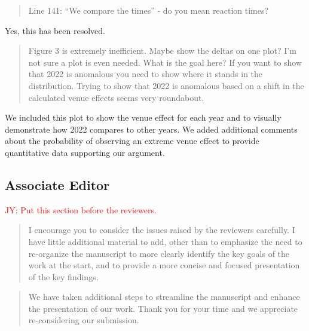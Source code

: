 \documentclass[12pt]{article}
\newcommand{\jy}[1]{\textcolor{red}{JY: #1}}
\newenvironment{comment}%
{\begin{quotation}\noindent\small\it\color{darkblue}\ignorespaces%
}{\end{quotation}}
\begin{document}
\begin{comment}
Line 141: “We compare the times” - do you mean reaction times?
\end{comment}

Yes, this has been resolved.

\begin{comment}
Figure 3 is extremely inefficient. Maybe show the deltas on one plot? I'm not
sure a plot is even needed. What is the goal here? If you want to show that 2022
is anomalous you need to show where it stands in the distribution. Trying to
show that 2022 is anomalous based on a shift in the calculated venue effects
seems very roundabout.
\end{comment}

We included this plot to show the venue effect for each year and to visually
demonstrate how 2022 compares to other years.  We added additional comments
about the probability of observing an extreme venue effect to provide
quantitative data supporting our argument.



\subsection*{Associate Editor}
\jy{Put this section before the reviewers.}

\begin{comment}
I encourage you to consider the issues raised by the reviewers carefully. I have
little additional material to add, other than to emphasize the need to
re-organize the manuscript to more clearly identify the key goals of the work at
the start, and to provide a more concise and focused presentation of the key
findings.
\end{comment}

\begin{comment}
We have taken additional steps to streamline the manuscript and enhance the
presentation of our work. Thank you for your time and we appreciate re-considering
our submission.
\end{comment}

%
%
\end{document}
